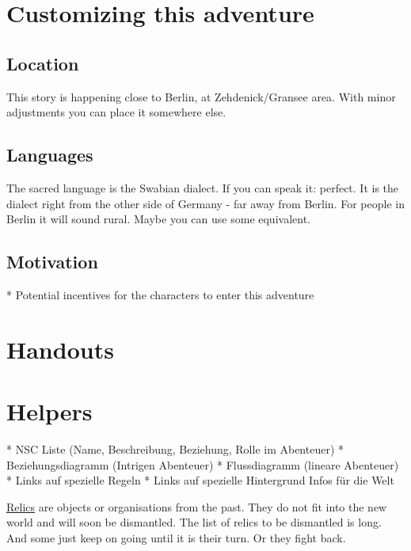 \section{Customizing this adventure}

\subsection{Location}
This story is happening close to Berlin, at Zehdenick/Gransee area. With minor adjustments you can place it somewhere else.

\subsection{Languages}
The sacred language is the Swabian dialect. If you can speak it: perfect. It is the dialect right from the other side of Germany - far away from Berlin. For people in Berlin it will sound rural. Maybe you can use some equivalent.

\subsection{Motivation}

* Potential incentives for the characters to enter this adventure


\section{Handouts}

\section{Helpers}

* NSC Liste (Name, Beschreibung, Beziehung, Rolle im Abenteuer)
* Beziehungsdiagramm (Intrigen Abenteuer)
* Flussdiagramm (lineare Abenteuer)
* Links auf spezielle Regeln
* Links auf spezielle Hintergrund Infos für die Welt



\begin{sidebarBox}[title=Relics]
\hyperref[sec:Relic]{Relics} are objects or organisations from the past. They do not fit into the new world and will soon be dismantled. The list of relics to be dismantled is long. And some just keep on going until it is their turn. Or they fight back.
\end{sidebarBox}

